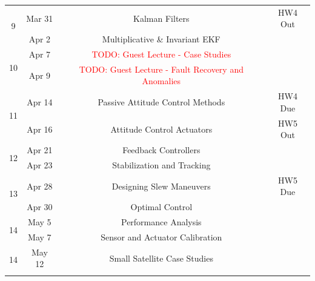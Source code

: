 \documentclass[11pt,letterpaper]{article}
\newcommand{\todo}[1]{\textcolor{red}{TODO: #1}}
\begin{document}
\begin{tabular}{c|c|c|c}
	\hline
	\multirow{2}{*}{9}  & Mar 31 & Kalman Filters
         & HW4 Out \\
	 & Apr 2 & Multiplicative \& Invariant EKF &  \\
	\hline
	\multirow{2}{*}{10}  & Apr 7 & \todo{Guest Lecture - Case Studies} 
         &  \\
	 & Apr 9 & \todo{Guest Lecture - Fault Recovery and Anomalies}  &   \\
	 \hline
	\multirow{2}{*}{11}  & Apr 14 & Passive Attitude Control Methods
         & HW4 Due \\
	 & Apr 16 & Attitude Control Actuators &  HW5 Out \\
	 \hline
	\multirow{2}{*}{12}  & Apr 21 & Feedback Controllers
         &   \\
	 & Apr 23 & Stabilization and Tracking &   \\
	 \hline
	\multirow{2}{*}{13}  & Apr 28 & Designing Slew Maneuvers
         & HW5 Due \\
	 & Apr 30 & Optimal Control &   \\
	 \hline
	\multirow{2}{*}{14}  & May 5 & Performance Analysis
         &  \\
	 & May 7 & Sensor and Actuator Calibration &   \\
	 \hline
	\multirow{2}{*}{14}  & May 12 &
        Small Satellite Case Studies &  \\
	 &  &  &   \\
\end{tabular}
\end{document}
